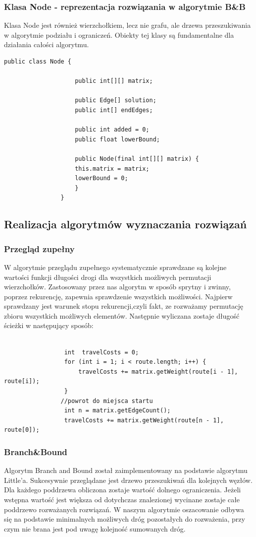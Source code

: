 \documentclass{article}
\begin{document}
		\subsubsection{Klasa Node - reprezentacja rozwiązania w algorytmie B\&B}
			Klasa Node jest również wierzchołkiem, lecz nie grafu, ale drzewa przeszukiwania w algorytmie podziału i ograniczeń. Obiekty tej klasy są fundamentalne dla działania całości algorytmu. 
				\begin{lstlisting}[xleftmargin=-150pt]
				public class Node {
					
					public int[][] matrix;
					
					public Edge[] solution;
					public int[] endEdges;
					
					public int added = 0;
					public float lowerBound;
					
					public Node(final int[][] matrix) {
					this.matrix = matrix;
					lowerBound = 0;
					}
				}
				\end{lstlisting}
	\subsection{Realizacja algorytmów wyznaczania rozwiązań}
		\subsubsection{Przegląd zupełny}
				W algorytmie przeglądu zupełnego systematycznie sprawdzane są kolejne wartości funkcji długości drogi dla wszystkich możliwych permutacji wierzchołków. Zastosowany przez nas algorytm w sposób sprytny i zwinny, poprzez rekurencję, zapewnia sprawdzenie wszystkich możliwości. Najpierw sprawdzany jest warunek stopu rekurencji,czyli fakt, ze rozważamy permutację zbioru wszystkich możliwych elementów. Następnie wyliczana zostaje długość ścieżki w następujący sposób:
				\begin{lstlisting}[xleftmargin=-150pt]
				
				 int  travelCosts = 0;
				 for (int i = 1; i < route.length; i++) {
					 travelCosts += matrix.getWeight(route[i - 1], route[i]);
				 }
				//powrot do miejsca startu
				 int n = matrix.getEdgeCount();
				 travelCosts += matrix.getWeight(route[n - 1], route[0]);
				\end{lstlisting}
		\subsubsection{Branch\&Bound}
			Algorytm Branch and Bound został zaimplementowany na podstawie algorytmu Little'a. Sukcesywnie przeglądane jest drzewo przeszukiwań dla kolejnych węzłów. Dla każdego poddrzewa obliczona zostaje wartość dolnego ograniczenia. Jeżeli wstępna wartość jest większa od dotychczas znalezionej wycinane zostaje całe poddrzewo rozważanych rozwiązań. W naszym algorytmie oszacowanie odbywa się na podstawie minimalnych możliwych dróg pozostałych do rozważenia, przy czym nie brana jest pod uwagę kolejność sumowanych dróg. 
\end{document}

